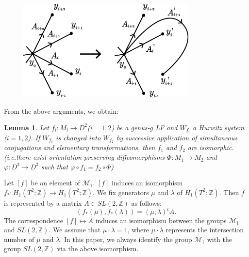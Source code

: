 \documentclass{amsart}
\theoremstyle{plain}
\newtheorem{lem}[thm]{Lemma}
\theoremstyle{definition}
\begin{document}
\begin{figure}[htbp]
\begin{center}
\includegraphics[width=90mm]{elem_trans.eps}
\end{center}
\caption{}
\label{elem_trans}
\end{figure}

From the above arguments, we obtain:

\begin{lem}

Let $f_i:M_i\rightarrow D^2$($i=1,2$) be a genus-$g$ LF and $W_{f_i}$ a Hurwitz system ($i=1,2$).
If $W_{f_1}$ is changed into $W_{f_2}$ by successive application of simultaneous conjugations and elementary transformations, 
then $f_1$ and $f_2$ are isomorphic.(i.e.there exist orientation preserving diffeomorphisms $\Phi:M_1\rightarrow M_2$ and $\varphi:D^2\rightarrow D^2$ such that $\varphi\circ f_1=f_2\circ\Phi$)

\end{lem}

Let $[f]$ be an element of $\mathcal{M}_1$. 
$[f]$ induces an isomorphism $f_\ast:H_1(T^2;\mathbb{Z})\rightarrow H_1(T^2;\mathbb{Z})$. 
We fix generators $\mu$ and $\lambda$ of $H_1(T^2;\mathbb{Z})$. 
Then $f$ is represented by a matrix $A\in SL(2,\mathbb{Z})$ as follows: 
\[
(f_\ast(\mu),f_\ast(\lambda))=(\mu,\lambda){}^tA. 
\]
The correspondence $[f]\mapsto A$ induces an isomorphism between the groups $\mathcal{M}_1$ and $SL(2,\mathbb{Z})$. 
We assume that $\mu\cdot\lambda=1$, where $\mu\cdot\lambda$ represents the intersection number of $\mu$ and $\lambda$. 
In this paper, we always identify the group $\mathcal{M}_1$ with the group $SL(2,\mathbb{Z})$ via the above isomorphism. 
\end{document}
